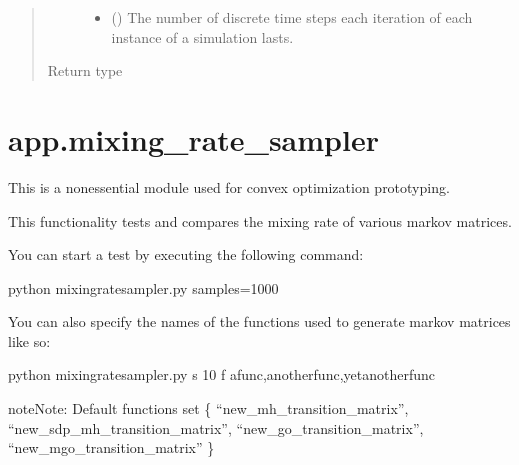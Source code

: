 \documentclass[letterpaper,10pt,english]{sphinxmanual}
\begin{document}
\begin{fulllineitems}
\begin{quote}
\begin{description}
\begin{itemize}
\item {} 
 () \textendash{} The number of discrete time steps each iteration of each instance
of a simulation lasts.

\end{itemize}

\item[{Return type}] \leavevmode
{}

\end{description}\end{quote}

\end{fulllineitems}



\section{app.mixing\_rate\_sampler}
\label{\detokenize{app:module-app.mixing_rate_sampler}}\label{\detokenize{app:app-mixing-rate-sampler}}
This is a non\sphinxhyphen{}essential module used for convex optimization prototyping.

This functionality tests and compares the mixing rate of various
markov matrices.

You can start a test by executing the following command:

\begin{sphinxVerbatim}[commandchars=\\\{\}]
\PYGZdl{} python mixing\PYGZus{}rate\PYGZus{}sampler.py \PYGZhy{}\PYGZhy{}samples=1000
\end{sphinxVerbatim}

You can also specify the names of the functions used to generate markov
matrices like so:

\begin{sphinxVerbatim}[commandchars=\\\{\}]
\PYGZdl{} python mixing\PYGZus{}rate\PYGZus{}sampler.py \PYGZhy{}s 10 \PYGZhy{}f afunc,anotherfunc,yetanotherfunc
\end{sphinxVerbatim}

\begin{sphinxadmonition}{note}{Note:}
Default functions set \{ “new\_mh\_transition\_matrix”,
“new\_sdp\_mh\_transition\_matrix”, “new\_go\_transition\_matrix”,
“new\_mgo\_transition\_matrix” \}
\end{sphinxadmonition}
\end{document}
